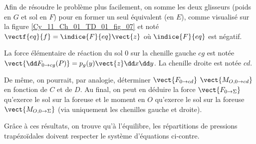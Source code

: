 


Afin de résoudre le problème plus 
facilement, on somme les deux 
glisseurs (poids en $G$ et sol en $F$) pour 
en former un seul équivalent (en $E$), 
comme visualisé sur la figure \ref{Cy_11_Ch_01_TD_01_fig_07} et noté 
$\vectf{eq}{f} = \indice{F}{eq} \vect{z}$ où $\indice{F}{eq}$ est négatif. 




 
La force élémentaire de réaction du sol 0 sur la chenille gauche $cg$ est notée 
$\vect{\dd F_{0\rightarrow cg}(P)} = p_g(y)\vect{z}\dd x\dd y $. 
La chenille droite est notée $cd$. 
 
 
 
 De même, on pourrait, par analogie, déterminer $\vect{F_{0\rightarrow cd}}$ $\vect{M_{O,0\rightarrow cd}}$ en fonction de $C$ et de $D$. Au final, on peut en déduire la force $\vect{F_{0\rightarrow \Sigma}}$
 qu’exerce le sol sur la foreuse et le moment en $O$ qu’exerce le sol sur la foreuse $\vect{M_{O,0\rightarrow \Sigma}}$ (via uniquement les chenilles gauche et droite).
 
 
Grâce à ces résultats, on trouve qu’à l’équilibre, les répartitions de pressions trapézoïdales doivent respecter le système d’équations ci-contre.


